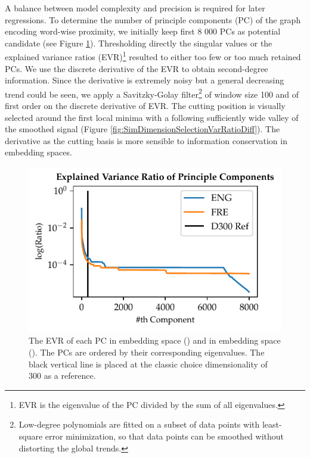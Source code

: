 A balance between model complexity and precision is required for later regressions. To determine the number of principle components (PC) of the graph encoding word-wise proximity, we initially keep first 8 000 PCs as potential candidate (see Figure \ref{fig:SimDimensionSeletionVarRatio}). Thresholding directly the singular values or the explained variance ratios (EVR)\footnote{EVR is the eigenvalue of the PC divided by the sum of all eigenvalues.} resulted to either too few or too much retained PCs. We use the discrete derivative of the EVR to obtain second-degree information. Since the derivative is extremely noisy but a general decreasing trend could be seen, we apply a Savitzky-Golay filter\footnote{Low-degree polynomials are fitted on a subset of data points with least-square error minimization, so that data points can be smoothed without distorting the global trends.} of window size 100 and of first order on the discrete derivative of EVR. The cutting position is visually selected around the first local minima with a following sufficiently wide valley of the smoothed signal (Figure \ref{fig:SimDimensionSelectionVarRatioDiff}). The derivative as the cutting basis is more sensible to information conservation in embedding spaces.

\begin{figure}
    \centering
    \includegraphics[scale=1]{Figures/SimDimensionSelectionVarRatio.pdf}
    \caption[Explained Variance Ratio of  Embedding Principle Components]{The EVR of each PC in  embedding space () and in  embedding space (). The PCs are ordered by their corresponding eigenvalues. The black vertical line is placed at the classic choice dimensionality of 300 as a reference.}
    \label{fig:SimDimensionSeletionVarRatio}
\end{figure}

